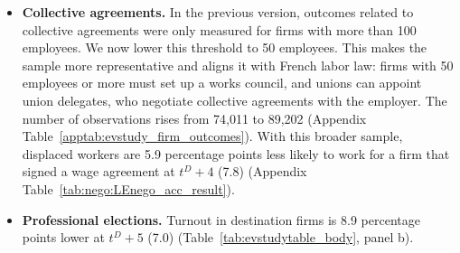 \documentclass[11pt]{article}
\begin{document}
{\begin{itemize}[leftmargin=*]
\item \textbf{Collective agreements.} In the previous version, outcomes related to collective agreements were only measured for firms with more than 100 employees. We now lower this threshold to 50 employees. This makes the sample more representative and aligns it with French labor law: firms with 50 employees or more must set up a works council, and unions can appoint union delegates, who negotiate collective agreements with the employer. The number of observations rises from 74,011 to 89,202 (Appendix Table~\ref{apptab:evstudy_firm_outcomes}). With this broader sample, displaced workers are 5.9 percentage points less likely to work for a firm that signed a wage agreement at $t^D+4$ (7.8) (Appendix Table~\ref{tab:nego:LEnego_acc_result}).

\item \textbf{Professional elections.} Turnout in destination firms is 8.9 percentage points lower at $t^D+5$ (7.0) (Table~\ref{tab:evstudytable_body}, panel b).
\end{itemize}}\par 



%
\end{document}

